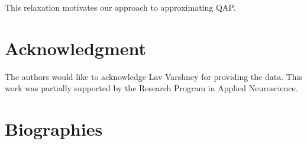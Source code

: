 \documentclass[preprint,11pt]{elsarticle}
\begin{document}
This relaxation motivates our approach to approximating QAP.

	



\section*{Acknowledgment}
% 
The authors would like to acknowledge 
Lav Varshney for providing the data. This work was partially supported by the Research Program in Applied Neuroscience. 
% 
% 


% 

\newpage
{}
\setcounter{page}{1}
\section*{Biographies}
\end{document}

